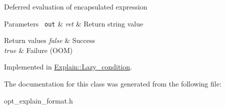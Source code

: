 Deferred evaluation of encapsulated expression


\begin{DoxyParams}[1]{Parameters}
\mbox{\texttt{ out}}  & {\em ret} & Return string value\\
\hline
\end{DoxyParams}

\begin{DoxyRetVals}{Return values}
{\em false} & Success \\
\hline
{\em true} & Failure (O\+OM) \\
\hline
\end{DoxyRetVals}


Implemented in \mbox{\hyperlink{classExplain_1_1Lazy__condition_a08922d6b5a4f18321486a7debecf5d02}{Explain\+::\+Lazy\+\_\+condition}}.



The documentation for this class was generated from the following file\+:\begin{DoxyCompactItemize}
\item 
opt\+\_\+explain\+\_\+format.\+h\end{DoxyCompactItemize}
